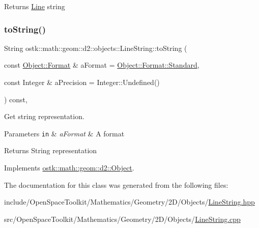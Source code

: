 \begin{DoxyReturn}{Returns}
\hyperlink{classostk_1_1math_1_1geom_1_1d2_1_1objects_1_1_line}{Line} string 
\end{DoxyReturn}
\mbox{\label{classostk_1_1math_1_1geom_1_1d2_1_1objects_1_1_line_string_a5312030bced48de68f8902bb6581461d}} 
\subsubsection{\texorpdfstring{to\+String()}{toString()}}
{\footnotesize\ttfamily String ostk\+::math\+::geom\+::d2\+::objects\+::\+Line\+String\+::to\+String (\begin{DoxyParamCaption}\item[{const \hyperlink{classostk_1_1math_1_1geom_1_1d2_1_1_object_aa76f9e30caebf4005bafbdff447f66cf}{Object\+::\+Format} \&}]{a\+Format = {\ttfamily \hyperlink{classostk_1_1math_1_1geom_1_1d2_1_1_object_aa76f9e30caebf4005bafbdff447f66cfaeb6d8ae6f20283755b339c0dc273988b}{Object\+::\+Format\+::\+Standard}},  }\item[{const Integer \&}]{a\+Precision = {\ttfamily Integer\+:\+:Undefined()} }\end{DoxyParamCaption}) const\hspace{0.3cm}{\ttfamily [override]}, {\ttfamily [virtual]}}



Get string representation. 


\begin{DoxyParams}[1]{Parameters}
\mbox{\tt in}  & {\em a\+Format} & A format \\
\hline
\end{DoxyParams}
\begin{DoxyReturn}{Returns}
String representation 
\end{DoxyReturn}


Implements \hyperlink{classostk_1_1math_1_1geom_1_1d2_1_1_object_ada4c2187dd24ef02b91b6346191f677c}{ostk\+::math\+::geom\+::d2\+::\+Object}.



The documentation for this class was generated from the following files\+:\begin{DoxyCompactItemize}
\item 
include/\+Open\+Space\+Toolkit/\+Mathematics/\+Geometry/2\+D/\+Objects/\hyperlink{2_d_2_objects_2_line_string_8hpp}{Line\+String.\+hpp}\item 
src/\+Open\+Space\+Toolkit/\+Mathematics/\+Geometry/2\+D/\+Objects/\hyperlink{2_d_2_objects_2_line_string_8cpp}{Line\+String.\+cpp}\end{DoxyCompactItemize}
